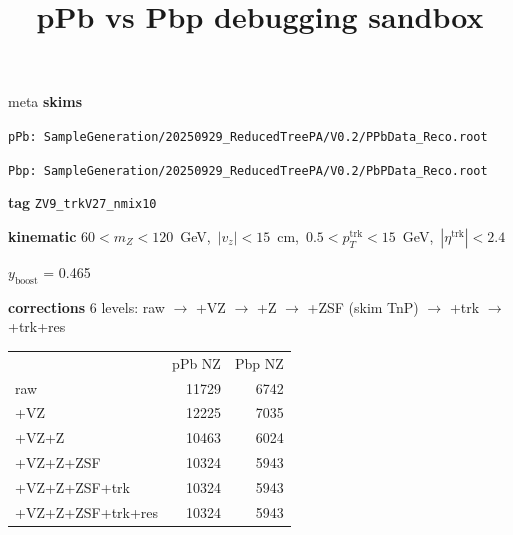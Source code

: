 \documentclass[aspectratio=169]{beamer}
\title{pPb vs Pbp debugging sandbox}
\date{}
\begin{document}
\begin{frame}
  \titlepage
\end{frame}

\begin{frame}[t]{meta}
  \small
  \textbf{skims}\par
  {\scriptsize
  \texttt{pPb: SampleGeneration/20250929\_ReducedTreePA/V0.2/PPbData\_Reco.root}\par
  \texttt{Pbp: SampleGeneration/20250929\_ReducedTreePA/V0.2/PbPData\_Reco.root}\par}
  \vspace{0.5em}
  \textbf{tag} \texttt{ZV9\_trkV27\_nmix10}\par
  \vspace{0.3em}
  \textbf{kinematic} $60 < m_Z < 120$~GeV,\ $|v_z| < 15$~cm,\ $0.5 < p_T^\text{trk} < 15$~GeV,\ $|\eta^\text{trk}| < 2.4$\par
  \vspace{0.3em}
  \textbf{$y_\text{boost}$} = 0.465\par
  \vspace{0.3em}
  \textbf{corrections} 6 levels: raw $\to$ +VZ $\to$ +Z $\to$ +ZSF (skim TnP) $\to$ +trk $\to$ +trk+res\par
  \vspace{0.3em}
  {\scriptsize
  \begin{tabular}{l r r}
              & pPb NZ    & Pbp NZ \\
  raw         & 11729     & 6742 \\
  +VZ         & 12225     & 7035 \\
  +VZ+Z       & 10463     & 6024 \\
  +VZ+Z+ZSF   & 10324     & 5943 \\
  +VZ+Z+ZSF+trk     & 10324     & 5943 \\
  +VZ+Z+ZSF+trk+res & 10324     & 5943 \\
  \end{tabular}}
\end{frame}
\end{document}
